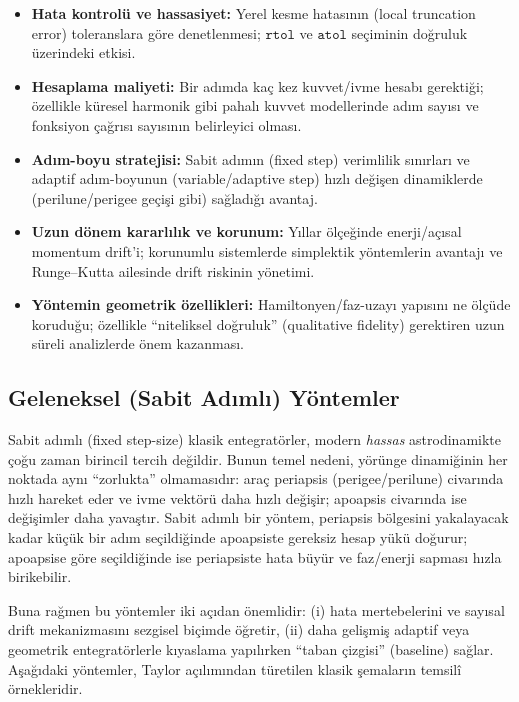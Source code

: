 \begin{itemize}
    \item \textbf{Hata kontrolü ve hassasiyet:} Yerel kesme hatasının (local truncation error) toleranslara göre
    denetlenmesi; $\texttt{rtol}$ ve $\texttt{atol}$ seçiminin doğruluk üzerindeki etkisi.
    \item \textbf{Hesaplama maliyeti:} Bir adımda kaç kez kuvvet/ivme hesabı gerektiği; özellikle küresel harmonik gibi
    pahalı kuvvet modellerinde adım sayısı ve fonksiyon çağrısı sayısının belirleyici olması.
    \item \textbf{Adım-boyu stratejisi:} Sabit adımın (fixed step) verimlilik sınırları ve adaptif adım-boyunun
    (variable/adaptive step) hızlı değişen dinamiklerde (perilune/perigee geçişi gibi) sağladığı avantaj.
    \item \textbf{Uzun dönem kararlılık ve korunum:} Yıllar ölçeğinde enerji/açısal momentum drift’i; korunumlu
    sistemlerde simplektik yöntemlerin avantajı ve Runge--Kutta ailesinde drift riskinin yönetimi.
    \item \textbf{Yöntemin geometrik özellikleri:} Hamiltonyen/faz-uzayı yapısını ne ölçüde koruduğu; özellikle
    ``niteliksel doğruluk'' (qualitative fidelity) gerektiren uzun süreli analizlerde önem kazanması.
\end{itemize}


\subsection{Geleneksel (Sabit Adımlı) Yöntemler}
Sabit adımlı (fixed step-size) klasik entegratörler, modern \emph{hassas} astrodinamikte çoğu zaman birincil tercih değildir.
Bunun temel nedeni, yörünge dinamiğinin her noktada aynı “zorlukta” olmamasıdır: araç periapsis (perigee/perilune) civarında
hızlı hareket eder ve ivme vektörü daha hızlı değişir; apoapsis civarında ise değişimler daha yavaştır.
Sabit adımlı bir yöntem, periapsis bölgesini yakalayacak kadar küçük bir adım seçildiğinde apoapsiste gereksiz hesap yükü doğurur;
apoapsise göre seçildiğinde ise periapsiste hata büyür ve faz/enerji sapması hızla birikebilir.

Buna rağmen bu yöntemler iki açıdan önemlidir: (i) hata mertebelerini ve sayısal drift mekanizmasını sezgisel biçimde öğretir,
(ii) daha gelişmiş adaptif veya geometrik entegratörlerle kıyaslama yapılırken “taban çizgisi” (baseline) sağlar.
Aşağıdaki yöntemler, Taylor açılımından türetilen klasik şemaların temsilî örnekleridir.

